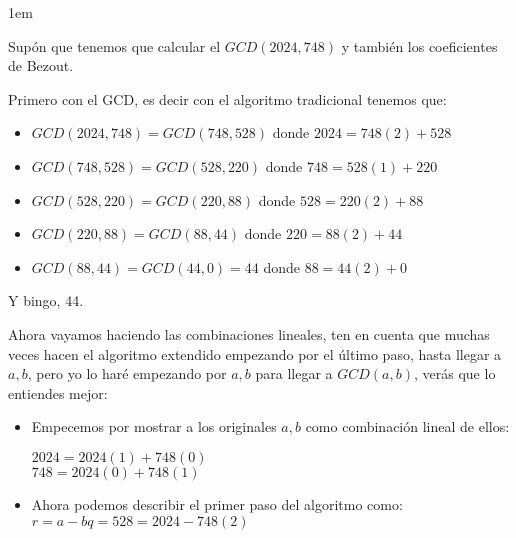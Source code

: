 \documentclass[12pt, fleqn]{report}                             %
\newcommand \Quote {\qq}                                        %
\newenvironment{SmallIndentation}[1][0.75em]                    %
    {\begin{adjustwidth}{#1}{}\begin{footnotesize}}                 %
    {\end{footnotesize}\end{adjustwidth}}                           %
\begin{document}
            \begin{SmallIndentation}[1em]
                Supón que tenemos que calcular el $GCD(2024, 748)$
                y también los coeficientes de Bezout.

                Primero con el GCD, es decir con el algoritmo tradicional
                tenemos que:

                \begin{itemize}
                    \item $GCD(2024, 748) = GCD(748, 528)$   donde $2024=748(2)+528$

                    \item $GCD(748, 528)  = GCD(528, 220)$   donde $748=528(1)+220$

                    \item $GCD(528, 220)  = GCD(220, 88)$    donde $528=220(2)+88$

                    \item $GCD(220, 88)   = GCD(88, 44)$     donde $220=88(2)+44$

                    \item $GCD(88, 44)    = GCD(44, 0) = 44$ donde $88=44(2)+0$
                \end{itemize}

                Y bingo, 44.


                Ahora vayamos haciendo las combinaciones lineales, 
                ten en cuenta que muchas veces hacen el algoritmo extendido empezando
                por el último paso, hasta llegar a $a,b$, pero yo lo haré \Quote{al réves}
                empezando por $a,b$ para llegar a $GCD(a,b)$, verás que lo entiendes mejor:


                \begin{itemize}
                    \item
                        Empecemos por mostrar a los originales $a,b$ como combinación lineal
                        de ellos:

                        $2024 = 2024(1) + 748(0)$\\
                        $748  = 2024(0) + 748(1)$

                    \item
                        Ahora podemos describir el primer paso del algoritmo como:\\
                        $r = a - bq = 528 = 2024 - 748(2)$


\end{itemize}
\end{SmallIndentation}
\end{document}
